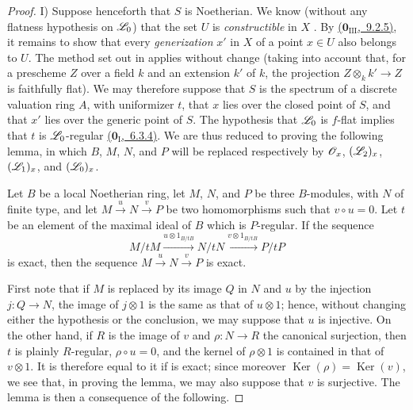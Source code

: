 \begin{proof}
\medskip
I) Suppose henceforth that $S$ is Noetherian.
We know (without any flatness hypothesis on $\mathscr{L}_0$) that the set $U$ is \emph{constructible} in $X$ .
By \hyperref[0.9.2.5]{($\mathbf{0}_{\mathrm{III}}$,~9.2.5)}, it remains to show that every \emph{generization} $x'$ in $X$ of a point $x\in U$ also belongs to $U$.
The method set out in  applies without change (taking into account that, for a prescheme $Z$ over a field $k$ and an extension $k'$ of $k$, the projection $Z\otimes_k k'\to Z$ is faithfully flat).
We may therefore suppose that $S$ is the spectrum of a discrete valuation ring $A$, with uniformizer $t$, that $x$ lies over the closed point of $S$, and that $x'$ lies over the generic point of $S$.
The hypothesis that $\mathscr{L}_0$ is $f$-flat implies that $t$ is $\mathscr{L}_0$-regular \hyperref[0.6.3.4]{($\mathbf{0}_{\mathrm{I}}$,~6.3.4)}.
We are thus reduced to proving the following lemma, in which $B$, $M$, $N$, and $P$ will be replaced respectively by $\mathscr{O}_x$, $(\mathscr{L}_2)_x$, $(\mathscr{L}_1)_x$, and $(\mathscr{L}_0)_x$.

\begin{lemma}[12.3.3.1]
\label{IV.12.3.3.1}
Let $B$ be a local Noetherian ring, let $M$, $N$, and $P$ be three $B$-modules, with $N$ of finite type, and let
$M\xrightarrow{u}N\xrightarrow{v}P$ be two homomorphisms such that $v\circ u=0$.
Let $t$ be an element of the maximal ideal of $B$ which is $P$-regular.
If the sequence
\begin{equation}
\tag{12.3.3.2}
\label{IV.12.3.3.2}
M/tM \xrightarrow{u\otimes 1_{B/tB}} N/tN \xrightarrow{v\otimes 1_{B/tB}} P/tP
\end{equation}
is exact, then the sequence $M\xrightarrow{u}N\xrightarrow{v}P$ is exact.
\end{lemma}

First note that if $M$ is replaced by its image $Q$ in $N$ and $u$ by the injection $j:Q\to N$, the image of $j\otimes 1$ is the same as that of $u\otimes 1$; hence, without changing either the hypothesis or the conclusion, we may suppose that $u$ is injective.
On the other hand, if $R$ is the image of $v$ and $\rho:N\to R$ the canonical surjection, then $t$ is plainly $R$-regular, $\rho\circ u=0$, and the kernel of $\rho\otimes 1$ is contained in that of $v\otimes 1$.
It is therefore equal to it if  is exact; since moreover $\operatorname{Ker}(\rho)=\operatorname{Ker}(v)$,
we see that, in proving the lemma, we may also suppose that $v$ is surjective.
The lemma is then a consequence of the following.


\end{proof}
